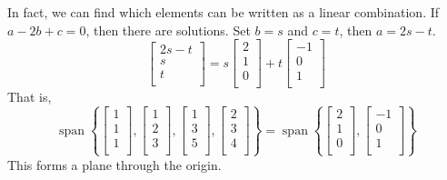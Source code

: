 \documentclass{article}
\DeclareMathOperator{\spn}{span}
\begin{document}
\begin{example}
  In fact, we can find which elements can be written as a linear combination.
  If $a -2b + c = 0$, then there are solutions.
  Set $b = s$ and $c = t$, then $a = 2s - t$.
  \[
    \begin{bmatrix}
      2s - t\\ s\\ t\\
    \end{bmatrix}
    =s
    \begin{bmatrix}
      2\\1\\0\\
    \end{bmatrix}
    +t
    \begin{bmatrix}
      -1\\
      0\\
      1\\
    \end{bmatrix}
  \]
  That is, \[
    \spn \left\{
      \begin{bmatrix}
        1\\ 1\\ 1\\
      \end{bmatrix},
      \begin{bmatrix}
        1\\ 2\\ 3\\
      \end{bmatrix},
      \begin{bmatrix}
        1\\ 3\\ 5\\
      \end{bmatrix},
      \begin{bmatrix}
        2\\ 3\\ 4\\
    \end{bmatrix}\right\}
    = \spn \left\{
      \begin{bmatrix}
        2\\1\\0\\
      \end{bmatrix},
      \begin{bmatrix}
        -1\\
        0\\
        1\\
      \end{bmatrix}
    \right\}
  \]
  This forms a plane through the origin.
\end{example}
\end{document}
